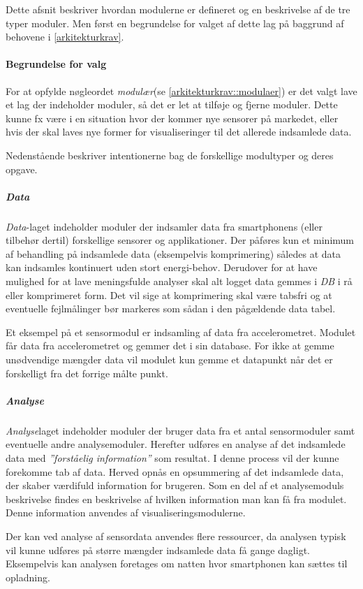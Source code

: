 Dette afsnit beskriver hvordan modulerne er defineret og en beskrivelse af de tre typer moduler.
Men først en begrundelse for valget af dette lag på baggrund af behovene i \cref{arkitekturkrav}.

\paragraph{Begrundelse for valg}
For at opfylde nøgleordet \textit{modulær}(se \cref{arkitekturkrav::modulaer}) er det valgt lave et lag der indeholder moduler, så det er let at tilføje og fjerne moduler.
Dette kunne fx være i en situation hvor der kommer nye sensorer på markedet, eller hvis der skal laves nye former for visualiseringer til det allerede indsamlede data.

Nedenstående beskriver intentionerne bag de forskellige modultyper og deres opgave.

\subparagraph{Data}
\textit{Data}-laget indeholder moduler der indsamler data fra smartphonens (eller tilbehør dertil) forskellige sensorer og applikationer.
Der påføres kun et minimum af behandling på indsamlede data (eksempelvis komprimering) således at data kan indsamles kontinuert uden stort energi-behov.
Derudover for at have mulighed for at lave meningsfulde analyser skal alt logget data gemmes i \textit{DB} i rå eller komprimeret form.
Det vil sige at komprimering skal være tabsfri og at eventuelle fejlmålinger bør markeres som sådan i den pågældende data tabel.

Et eksempel på et sensormodul er indsamling af data fra accelerometret.
Modulet får data fra accelerometret og gemmer det i sin database. 
For ikke at gemme unødvendige mængder data vil modulet kun gemme et datapunkt når det er forskelligt fra det forrige målte punkt.

\subparagraph{Analyse}
\textit{Analyse}laget indeholder moduler der bruger data fra et antal sensormoduler samt eventuelle andre analysemoduler.
Herefter udføres en analyse af det indsamlede data med \textit{''forståelig information''} som resultat.
I denne process vil der kunne forekomme tab af data.
Herved opnås en opsummering af det indsamlede data, der skaber værdifuld information for brugeren.
Som en del af et analysemoduls beskrivelse findes en beskrivelse af hvilken information man kan få fra modulet.
Denne information anvendes af visualiseringsmodulerne.

Der kan ved analyse af sensordata anvendes flere ressourcer, da analysen typisk vil kunne udføres på større mængder indsamlede data få gange dagligt.
Eksempelvis kan analysen foretages om natten hvor smartphonen kan sættes til opladning.

